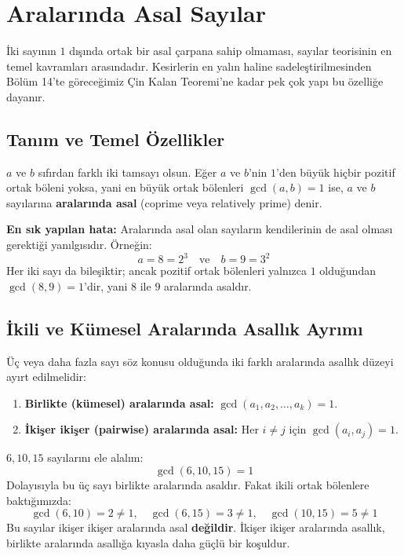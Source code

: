 \section{Aralarında Asal Sayılar}

İki sayının $1$ dışında ortak bir asal çarpana sahip olmaması, sayılar teorisinin en temel kavramları arasındadır. Kesirlerin en yalın haline sadeleştirilmesinden Bölüm 14'te göreceğimiz Çin Kalan Teoremi'ne kadar pek çok yapı bu özelliğe dayanır.

\subsection{Tanım ve Temel Özellikler}

\begin{definition}
$a$ ve $b$ sıfırdan farklı iki tamsayı olsun. Eğer $a$ ve $b$'nin $1$'den büyük hiçbir pozitif ortak böleni yoksa, yani en büyük ortak bölenleri $\gcd(a, b) = 1$ ise, $a$ ve $b$ sayılarına \textbf{aralarında asal} (coprime veya relatively prime) denir.
\end{definition}

\textbf{En sık yapılan hata:} Aralarında asal olan sayıların kendilerinin de asal olması gerektiği yanılgısıdır. Örneğin:
\[ a = 8 = 2^3 \quad \text{ve} \quad b = 9 = 3^2 \]
Her iki sayı da bileşiktir; ancak pozitif ortak bölenleri yalnızca $1$ olduğundan $\gcd(8, 9) = 1$'dir, yani $8$ ile $9$ aralarında asaldır.

\subsection{İkili ve Kümesel Aralarında Asallık Ayrımı}

Üç veya daha fazla sayı söz konusu olduğunda iki farklı aralarında asallık düzeyi ayırt edilmelidir:
\begin{enumerate}
    \item \textbf{Birlikte (kümesel) aralarında asal:} $\gcd(a_1, a_2, \dots, a_k) = 1$.
    \item \textbf{İkişer ikişer (pairwise) aralarında asal:} Her $i \ne j$ için $\gcd(a_i, a_j) = 1$.
\end{enumerate}

\begin{example}
$6, 10, 15$ sayılarını ele alalım:
\[ \gcd(6, 10, 15) = 1 \]
Dolayısıyla bu üç sayı birlikte aralarında asaldır. Fakat ikili ortak bölenlere baktığımızda:
\[ \gcd(6, 10) = 2 \ne 1, \quad \gcd(6, 15) = 3 \ne 1, \quad \gcd(10, 15) = 5 \ne 1 \]
Bu sayılar ikişer ikişer aralarında asal \textbf{değildir}. İkişer ikişer aralarında asallık, birlikte aralarında asallığa kıyasla daha güçlü bir koşuldur.
\end{example}

